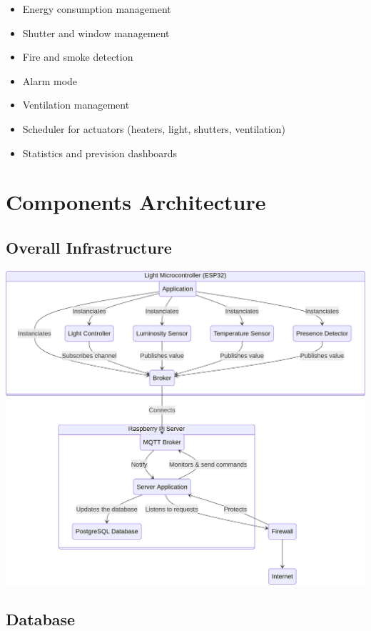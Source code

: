 \documentclass{report}
\begin{document}
        \begin{itemize}
            \item Energy consumption management
            \item Shutter and window management
            \item Fire and smoke detection
            \item Alarm mode
            \item Ventilation management
            \item Scheduler for actuators (heaters, light, shutters, ventilation)
            \item Statistics and prevision dashboards
        \end{itemize}

    \section{Components Architecture}\label{sec:components-architecture}

        \subsection{Overall Infrastructure}\label{subsec:overall-infrastructure}

        \includegraphics[width=17cm]{ui/assets/img/overall-infrastructure}

        \subsection{Database}\label{subsec:database}
\end{document}
